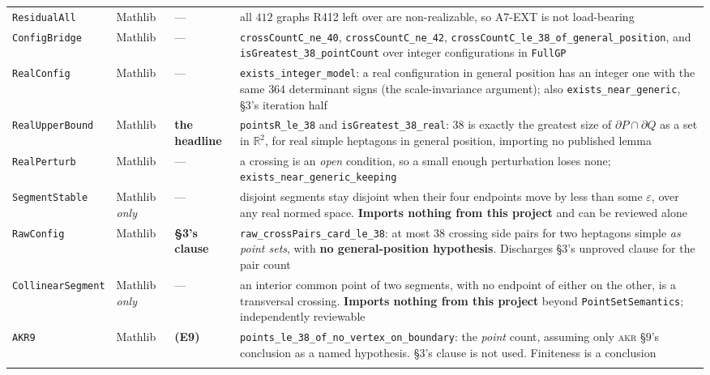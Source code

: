 \documentclass[11pt,a4paper]{article}
\theoremstyle{plain}
\theoremstyle{definition}
\theoremstyle{remark}
\begin{document}
{\begin{longtable}{@{}>{\raggedright\arraybackslash}p{3.3cm}>{\raggedright\arraybackslash}p{1.5cm}>{\raggedright\arraybackslash}p{1.6cm}>{\raggedright\arraybackslash}p{7.4cm}@{}}
\texttt{ResidualAll} & Mathlib & --- & all $412$ graphs \textsf{R412} left over are non-realizable, so \textsf{A7-EXT} is not load-bearing \\
\texttt{ConfigBridge} & Mathlib & --- & \texttt{crossCountC\_ne\_40}, \texttt{crossCountC\_ne\_42}, \texttt{crossCountC\_le\_38\_of\_general\_position}, and \texttt{isGreatest\_38\_pointCount} over integer configurations in \texttt{FullGP} \\
\texttt{RealConfig} & Mathlib & --- & \texttt{exists\_integer\_model}: a real configuration in general position has an integer one with the same $364$ determinant signs (the scale-invariance argument); also \texttt{exists\_near\_generic}, \S3's iteration half \\
\texttt{RealUpperBound} & Mathlib & \textbf{the headline} & \texttt{pointsR\_le\_38} and \texttt{isGreatest\_38\_real}: $38$ is exactly the greatest size of $\partial P\cap\partial Q$ as a set in $\mathbb{R}^2$, for real simple heptagons in general position, importing no published lemma \\
\texttt{RealPerturb} & Mathlib & --- & a crossing is an \emph{open} condition, so a small enough perturbation loses none; \texttt{exists\_near\_generic\_keeping} \\
\texttt{SegmentStable} & Mathlib \emph{only} & --- & disjoint segments stay disjoint when their four endpoints move by less than some $\varepsilon$, over any real normed space. \textbf{Imports nothing from this project} and can be reviewed alone \\
\texttt{RawConfig} & Mathlib & \textbf{\S3's clause} & \texttt{raw\_crossPairs\_card\_le\_38}: at most $38$ crossing side pairs for two heptagons simple \emph{as point sets}, with \textbf{no general-position hypothesis}. Discharges \S3's unproved clause for the pair count \\
\texttt{CollinearSegment} & Mathlib \emph{only} & --- & an interior common point of two segments, with no endpoint of either on the other, is a transversal crossing. \textbf{Imports nothing from this project} beyond \texttt{PointSetSemantics}; independently reviewable \\
\texttt{AKR9} & Mathlib & \textbf{(E9)} & \texttt{points\_le\_38\_of\_no\_vertex\_on\_boundary}: the \emph{point} count, assuming only \textsc{akr} \S9's conclusion as a named hypothesis. \S3's clause is not used. Finiteness is a conclusion \\
\addlinespace
\multicolumn{4}{@{}l}{\emph{Class data and the classification}}\\

\end{longtable}}
\end{document}
